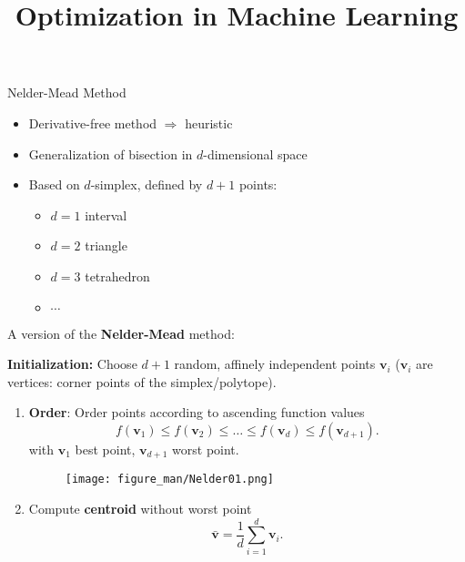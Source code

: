 \documentclass[11pt,compress,t,notes=noshow, xcolor=table]{beamer}
\title{Optimization in Machine Learning}
\begin{document}


\begin{vbframe}{Nelder-Mead Method}

\begin{itemize}
\item Derivative-free method $\Rightarrow$ heuristic
\item Generalization of bisection in $d$-dimensional space
\item Based on $d$-simplex, defined by $d + 1$ points:
\begin{itemize}
\small
\item $d = 1$ interval
\item $d = 2$ triangle
\item $d = 3$ tetrahedron
\item $\cdots$
\end{itemize}
\end{itemize}

\framebreak

A version of the \textbf{Nelder-Mead} method:

\medskip

\textbf{Initialization:} Choose $d + 1$ random, affinely independent points $\mathbf{v}_i$ ($\mathbf{v}_i$ are vertices: corner points of the simplex/polytope).

\medskip

\begin{enumerate}
\item \textbf{Order}: Order points according to ascending function values
$$
f(\mathbf{v}_1) \leq f(\mathbf{v}_2) \leq \ldots \leq f(\mathbf{v}_d) \leq f(\mathbf{v}_{d + 1}).
$$
with $\mathbf{v}_1$ best point, $\mathbf{v}_{d + 1}$ worst point.

\begin{figure}
\texttt{[image: figure\_man/Nelder01.png]}
\end{figure}

\item Compute \textbf{centroid} without worst point
$$
\bar{\mathbf{v}} = \frac{1}{d} \sum_{i = 1}^d \mathbf{v}_i.
$$


\end{enumerate}
\end{vbframe}
\end{document}
